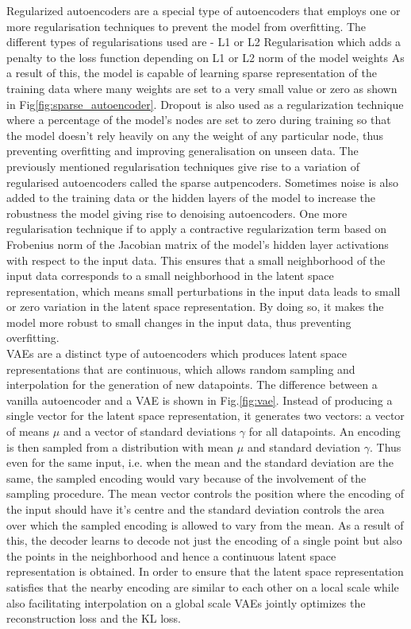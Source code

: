 Regularized autoencoders are a special type of autoencoders that employs one or more regularisation techniques to prevent the model from overfitting. The different types of regularisations used are - L1 or L2 Regularisation which adds a penalty to the loss function depending on L1 or L2 norm of the model weights As a result of this, the model is capable of learning sparse representation of the training data where many weights are set to a very small value or zero as shown in Fig\ref*{fig:sparse_autoencoder}. Dropout is also used as a regularization technique where a percentage of the model's nodes are set to zero during training so that the model doesn't rely heavily on any the weight of any particular node, thus preventing overfitting and improving generalisation on unseen data. The previously mentioned regularisation techniques give rise to a variation of regularised autoencoders called the sparse autpencoders\cite*{ng2011sparse}. Sometimes noise is also added to the training data or the hidden layers of the model to increase the robustness the model giving rise to denoising autoencoders\cite*{vincent2008extracting}. One more regularisation technique if to apply a contractive regularization term based on Frobenius norm of the Jacobian matrix of the model's hidden layer activations with respect to the input data\cite*{rifai2011contractive,autoencoder}. This ensures that a small neighborhood of the input data corresponds to a small neighborhood in the latent space representation, which means small perturbations in the input data leads to small or zero variation in the latent space representation\cite*{rifai2011contractive,autoencoder}. By doing so, it makes the model more robust to small changes in the input data, thus preventing overfitting.\\
\ac{VAE}s are a distinct type of autoencoders which produces latent space representations that are continuous, which allows random sampling and interpolation for the generation of new datapoints. The difference between a vanilla autoencoder and a \ac*{VAE} is shown in Fig.\ref*{fig:vae}. Instead of producing a single vector for the latent space representation, it generates two vectors: a vector of means $\mu$ and a vector of standard deviations $\gamma$ for all datapoints. An encoding is then sampled from a distribution with mean $\mu$ and standard deviation $\gamma$. Thus even for the same input, i.e. when the mean and the standard deviation are the same, the sampled encoding would vary because of the involvement of the sampling procedure. The mean vector controls the position where the encoding of the input should have it's centre and the standard deviation controls the area over which the sampled encoding is allowed to vary from the mean. As a result of this, the decoder learns to decode not just the encoding of a single point but also the points in the neighborhood and hence a continuous latent space representation is obtained. In order to ensure that the latent space representation satisfies that the nearby encoding are similar to each other on a local scale while also facilitating interpolation on a global scale \ac{VAE}s jointly optimizes the reconstruction loss and the \ac*{KL}\cite*{kullback1951information} loss.\cite*{kingma2019introduction,vae}

